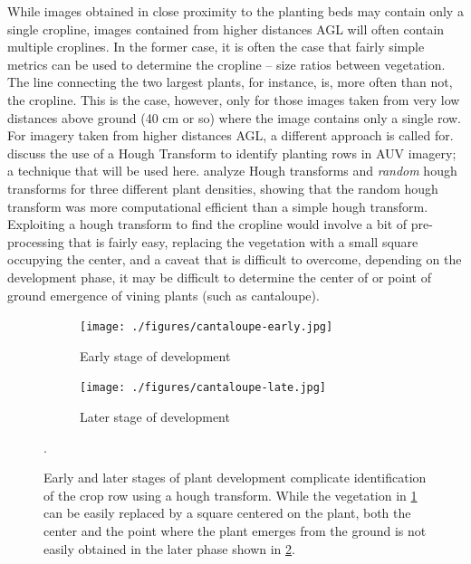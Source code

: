 \documentclass[letterpaper]{article}
\begin{document}
{While images obtained in close proximity to the planting beds may contain only a single cropline, images contained from higher distances AGL will often contain multiple croplines. In the former case, it is often the case that fairly simple metrics can be used to determine the cropline -- size ratios between vegetation.  The line connecting the two largest plants, for instance, is, more often than not, the cropline. This is the case, however, only for those images taken from very low distances above ground (40 cm or so) where the image contains only a single row. For imagery taken from higher distances AGL, a different approach is called for. \citeauthor*{Dian_Bah2017-kd} discuss the use of a Hough Transform \parencite{Illingworth1988-nw} to identify planting rows in AUV imagery; a technique that will be used here. \citeauthor{Ji2011-qb} analyze Hough transforms and \textit{random} hough transforms \parencite{Ji2011-qb} for three different plant densities, showing that the random hough transform was more computational efficient than a simple hough transform. Exploiting a hough transform to find the cropline would involve a bit of pre-processing that is fairly easy, replacing the vegetation with a small square occupying the center, and a caveat that is difficult to overcome, depending on the development phase, it may be difficult to determine the center of or point of ground emergence of vining plants (such as cantaloupe).

\begin{figure}[H]
	\centering
	\begin{subfigure}[h]{0.45\linewidth}
		\centering
		\texttt{[image: ./figures/cantaloupe-early.jpg]}
		\caption{Early stage of development}
		\label{subfig:cantaloupe-early}	
	\end{subfigure}
	\begin{subfigure}[h]{0.45\linewidth}
		\centering
		\texttt{[image: ./figures/cantaloupe-late.jpg]}
		\caption{Later stage of development}
		\label{subfig:cantaloupe-late}		
	\end{subfigure}%
	\caption[Early and later stages of vining plant development]{Early and later stages of plant development complicate identification of the crop row using a hough transform. While the vegetation in \ref{subfig:cantaloupe-early} can be easily replaced by a square centered on the plant, both the center and the point where the plant emerges from the ground is not easily obtained in the later phase shown in \ref{subfig:cantaloupe-late}.}.
	\label{fig:cantaloupe}
\end{figure}

}
\end{document}
